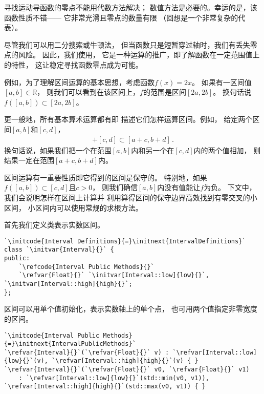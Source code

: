 寻找运动导函数的零点不能用代数方法解决；
数值方法是必要的。幸运的是，该函数性质不错——
它非常光滑且零点的数量有限
（回想是一个非常复杂的代表）。

尽管我们可以用二分搜索或牛顿法，
但当函数只是短暂穿过轴时，我们有丢失零点的风险。
因此，我们使用，
它是一种运算的推广，即了解函数在一定范围值上的特性，
这让稳定寻找函数零点成为可能。

例如，为了理解区间运算的基本思想，考虑函数$f(x)=2x$。
如果有一区间值$[a,b]\in\mathbb{R}$，
则我们可以看到在该区间上，$f$的范围是区间$[2a,2b]$。
换句话说$f([a,b])\subset[2a,2b]$。

更一般地，所有基本算术运算都有即
描述它们怎样运算区间。例如，
给定两个区间$[a,b]$和$[c,d]$，
\begin{align*}
    [a,b]+[c,d]\subset [a+c,b+d]\, .
\end{align*}
换句话说，如果我们把一个在范围$[a,b]$内和另一个在$[c,d]$内的两个值相加，
则结果一定在范围$[a+c,b+d]$内。

区间运算有一重要性质即它得到的区间是保守的。
特别地，如果$f([a,b])\subset[c,d]$且$c>0$，
则我们确信$[a,b]$内没有值能让$f$为负。
下文中，我们会说明怎样在区间上计算并
利用算得区间的保守边界高效找到有零交叉的小区间，
小区间内可以使用常规的求根方法。

首先我们定义类表示实数区间。
\begin{lstlisting}
`\initcode{Interval Definitions}{=}\initnext{IntervalDefinitions}`
class `\initvar{Interval}{}` {
public:
    `\refcode{Interval Public Methods}{}`
    `\refvar{Float}{}` `\initvar[Interval::low]{low}{}`, `\initvar[Interval::high]{high}{}`;
};
\end{lstlisting}

区间可以用单个值初始化，表示实数轴上的单个点，
也可用两个值指定非零宽度的区间。
\begin{lstlisting}
`\initcode{Interval Public Methods}{=}\initnext{IntervalPublicMethods}`
`\refvar{Interval}{}`(`\refvar{Float}{}` v) : `\refvar[Interval::low]{low}{}`(v), `\refvar[Interval::high]{high}{}`(v) { }
`\refvar{Interval}{}`(`\refvar{Float}{}` v0, `\refvar{Float}{}` v1)
    : `\refvar[Interval::low]{low}{}`(std::min(v0, v1)), `\refvar[Interval::high]{high}{}`(std::max(v0, v1)) { }
\end{lstlisting}

